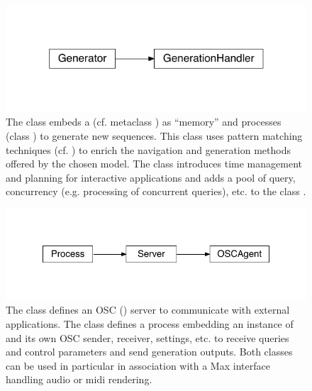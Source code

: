 \documentclass[letterpaper,10pt,english]{sphinxmanual}
\begin{document}
\begin{figure}[htbp]
\centering
\capstart

\includegraphics{inheritance-45389eff6d71c56e9ebdb1c18f0709c68c075428.pdf}
\caption{The class {\hyperref[\detokenize{index:Generator.Generator}]{}} embeds a  (cf. metaclass {\hyperref[\detokenize{index:MetaModelNavigator.MetaModelNavigator}]{}}) as “memory” and processes  (class {\hyperref[\detokenize{index:Query.Query}]{}}) to generate new sequences. This class uses pattern matching techniques (cf. {\hyperref[\detokenize{index:module-PrefixIndexing}]{}}) to enrich the navigation and generation methods offered by the chosen model. The class {\hyperref[\detokenize{index:Generator.GenerationHandler}]{}} introduces time management and planning for interactive applications and adds a pool of query, concurrency (e.g. processing of concurrent queries), etc. to the class {\hyperref[\detokenize{index:Generator.Generator}]{}}.}\label{\detokenize{index:id5}}\end{figure}

\begin{figure}[htbp]
\centering
\capstart

\includegraphics{inheritance-def9fd93a357ceca4452c5c313a453f38e18390c.pdf}
\caption{The class  defines an OSC () server to communicate with external applications. The class  defines a process embedding an instance of {\hyperref[\detokenize{index:Generator.GenerationHandler}]{}} and its own OSC sender, receiver, settings, etc. to receive queries and control parameters and send generation outputs. Both classes can be used in particular in association with a Max interface handling audio or midi rendering.}\label{\detokenize{index:id6}}\end{figure}
\end{document}
